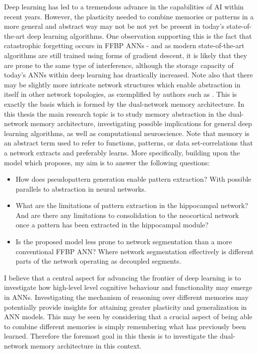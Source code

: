 Deep learning has led to a tremendous advance in the capabilities of AI within recent years. However, the plasticity needed to combine memories or patterns in a more general and abstract way may not be not yet be present in today's state-of-the-art deep learning algorithms. One observation supporting this is the fact that catastrophic forgetting occurs in FFBP ANNs - and as modern state-of-the-art algorithms are still trained using forms of gradient descent, it is likely that they are prone to the same type of interference, although the storage capacity of today's ANNs within deep learning has drastically increased. 
Note also that there may be slightly more intricate network structures which enable abstraction in itself in other network topologies, as exemplified by authors such as \cite{Tani2014}. This is exactly the basis which is formed by the dual-network memory architecture.
In this thesis the main research topic is to study memory abstraction in the dual-network memory architecture, investigating possible implications for general deep learning algorithms, as well as computational neuroscience. Note that memory is an abstract term used to refer to functions, patterns, or data set-correlations that a network extracts and preferably learns. More specifically, building upon the model which \cite{Hattori2014} proposes, my aim is to answer the following questions:
\begin{itemize}
\item How does pseudopattern generation enable pattern extraction? With possible parallels to abstraction in neural networks.
\item What are the limitations of pattern extraction in the hippocampal network? And are there any limitations to consolidation to the neocortical network once a pattern has been extracted in the hippocampal module?
\item Is the proposed model less prone to network segmentation than a more conventional FFBP ANN? Where network segmentation effectively is different parts of the network operating as decoupled segments.
\end{itemize}

I believe that a central aspect for advancing the frontier of deep learning is to investigate how high-level level cognitive behaviour and functionality may emerge in ANNs. Investigating the mechanism of reasoning over different memories may potentially provide insights for attaining greater plasticity and generalization in ANN models. This may be seen by considering that a crucial aspect of being able to combine different memories is simply remembering what has previously been learned. Therefore the foremost goal in this thesis is to investigate the dual-network memory architecture in this context.

